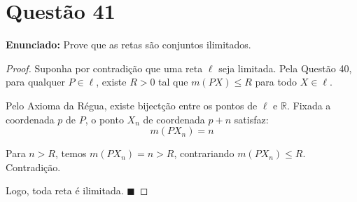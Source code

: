 \documentclass[12pt,a4paper]{article}
\begin{document}
\section*{Quest\~ao 41}

\textbf{Enunciado:} Prove que as retas s\~ao conjuntos ilimitados.

\begin{proof}
Suponha por contradi\c{c}\~ao que uma reta $\ell$ seja limitada. Pela Quest\~ao 40, para qualquer $P \in \ell$, existe $R > 0$ tal que $m(PX) \leq R$ para todo $X \in \ell$.

Pelo Axioma da R\'egua, existe biject\c{c}\~ao entre os pontos de $\ell$ e $\mathbb{R}$. Fixada a coordenada $p$ de $P$, o ponto $X_n$ de coordenada $p + n$ satisfaz:
$$m(PX_n) = n$$

Para $n > R$, temos $m(PX_n) = n > R$, contrariando $m(PX_n) \leq R$. Contradi\c{c}\~ao.

Logo, toda reta \'e ilimitada. $\blacksquare$
\end{proof}
\end{document}
